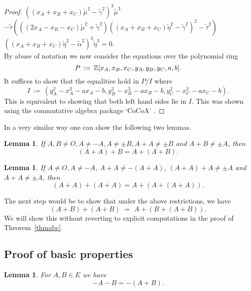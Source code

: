 \documentclass[12pt]{amsart}
\theoremstyle{plain}
\newtheorem{lemma}[theorem]{Lemma}
\theoremstyle{remark}
\theoremstyle{definition}
\def \Z {\mathbf{Z}}
\def\Z{\Bbb{Z}}
\begin{document}
\begin{proof}
\hspace*{1cm}$((x_A+x_B+x_C)\widetilde\mu^2-\widetilde\gamma^2)^3\widetilde\mu^3$\\
\vspace{0.1cm}
$-\widetilde\tau(((2x_A-x_B-x_C)\widetilde\mu^2+\widetilde\gamma^2)
  ((x_A+x_B+x_C)\widetilde\eta^2-\widetilde\gamma^2)^2-\widetilde\tau^2)$\\
\vspace{0.1cm}
\hspace*{1cm}$((x_A+x_B+x_C)\widetilde\eta^2-\widetilde\alpha^2)^3\widetilde\eta^3=0.$\\[0.3cm]
By abuse of notation we now consider the equations
over the polynomial ring 
\[ P\,:=\,\Z[x_A,x_B,x_C,y_A,y_B,y_C,a,b].\]
It suffices to show that the equalities hold in $P/I$
where 
\[ I\,:=\,(y_A^2-x_A^3-ax_A-b,y_B^2-x_B^3-ax_B-b, y_C^2-x_C^3-ax_C-b).\]
This is equivalent to showing that both left hand sides lie in $I$.
This was shown using
the commutative algebra package `CoCoA' \cite{cocoa}.
\end{proof}

In a very similar way one can show the following two lemmas.

\begin{lemma} \label{claimaac}
If $A,B \ne O, A \neq -A, A \neq \pm B, A+A\not=\pm B$ and
$A+B\not=\pm A$, then
 \[ (A+A)+B=A+(A+B). \]
\end{lemma}

\begin{lemma} \label{claimaaaa}
If $A \ne O, A \neq -A$, $A+A \neq -(A+A)$, $(A+A)+A \neq \pm A$
and $A+A \neq \pm A$, then
\[ (A+A)+(A+A)=A+(A+(A+A)). \]
\end{lemma}


The next step would be to show that under the above restrictions, we have
\[(A+B)+(A+B)\,\,=\,\,A+(B+(A+B)).\]
We will show this without reverting to explicit computations in the proof of Theorem~\ref{thmabc}.


\subsection{Proof of basic properties} \label{sectionsp}

\begin{lemma} \label{claim2}
For $A,B\in E$ we have
  \[ -A-B=-(A+B).\]
\end{lemma}
\end{document}

